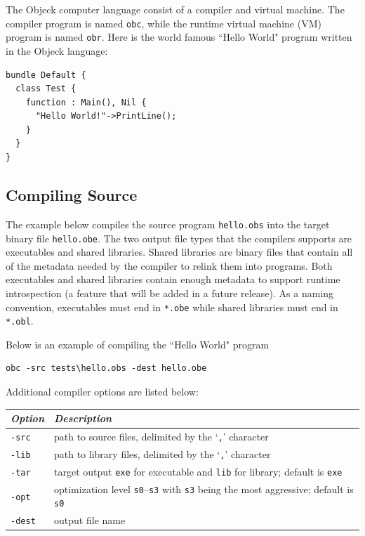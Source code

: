 \documentclass[12pt]{article}
\begin{document}
The Objeck computer language consist of a compiler and virtual machine.  The compiler program is named \texttt{obc}, while the runtime virtual machine (VM) program is named \texttt{obr}.  Here is the world famous ``Hello World" program written in the Objeck language:

\begin{verbatim}
bundle Default {
  class Test {
    function : Main(), Nil {
      "Hello World!"->PrintLine();
    }
  }
}
\end{verbatim}

\subsection{Compiling Source}
The example below compiles the source program \texttt{hello.obs} into the target binary file \texttt{hello.obe}.  The two output file types that the compilers supports are executables and shared libraries.  Shared libraries are binary files that contain all of the metadata needed by the compiler to relink them into programs.  Both executables and shared libraries contain enough metadata to support runtime introspection (a feature that will be added in a future release).  As a naming convention, executables must end in \texttt{*.obe} while shared libraries must end in \texttt{*.obl}.

Below is an example of compiling the ``Hello World" program
\begin{verbatim}
obc -src tests\hello.obs -dest hello.obe
\end{verbatim}

Additional compiler options are listed below:
\begin{center}
\begin{tabular}{| l | l |}
\hline
\emph{Option} & \emph{Description} \\ \hline \hline
\texttt{-src} & path to source files, delimited by the `\texttt{,}' character \\ \hline
\texttt{-lib} & path to library files, delimited by the `\texttt{,}' character \\ \hline
\texttt{-tar} & target output \texttt{exe} for executable and \texttt{lib} for library; default is  \texttt{exe} \\ \hline
\texttt{-opt} & optimization level \texttt{s0}--\texttt{s3} with \texttt{s3} being the most aggressive; default is \texttt{s0} \\ \hline
\texttt{-dest} & output file name \\ \hline
\end{tabular}
\end{center}
\end{document}
